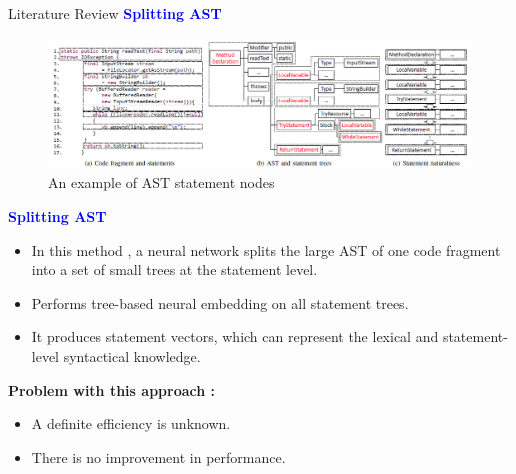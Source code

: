 \begin{frame}[allowframebreaks]{Literature Review}
\textcolor{blue}{\textbf{Splitting AST}}
\begin{figure}
    \centering
    \includegraphics[width=0.9\linewidth]{images/split-ast.png}
    \caption{An example of AST statement nodes \cite{zhang2019novel}}
\end{figure}
\framebreak

\textcolor{blue}{\textbf{Splitting AST}}
\medskip
\begin{itemize}
    \item In this method \cite{zhang2019novel}, a neural network splits the large AST of one code fragment into a set of small trees at the statement level.
    \item Performs tree-based neural embedding on all statement trees.
    \item It produces statement vectors, which can represent the lexical and statement-level syntactical knowledge.
\end{itemize}
\medskip
\par\textbf{Problem with this approach \cite{zhang2019novel}:}
\begin{itemize}
    \item A definite efficiency is unknown.
    \item There is no improvement in performance.
\end{itemize}
\end{frame}